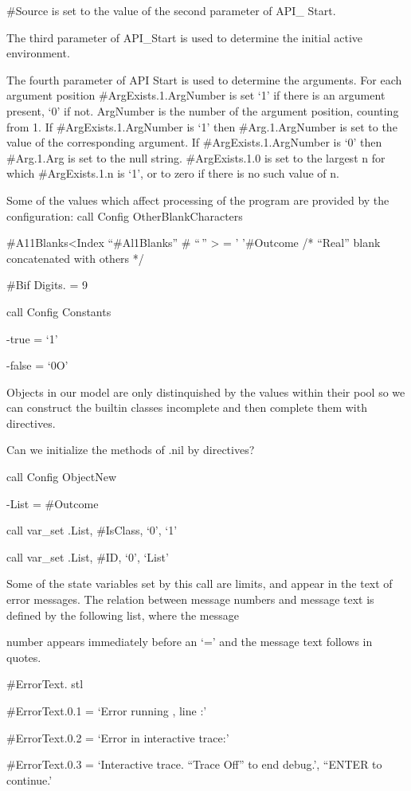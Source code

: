 \#Source is set to the value of the second parameter of API\_ Start.

The third parameter of API\_Start is used to determine the initial
active environment.

The fourth parameter of API Start is used to determine the arguments.
For each argument position \#ArgExists.1.ArgNumber is set `1' if there
is an argument present, `0' if not. ArgNumber is the number of the
argument position, counting from 1. If \#ArgExists.1.ArgNumber is `1'
then \#Arg.1.ArgNumber is set to the value of the corresponding
argument. If \#ArgExists.1.ArgNumber is `0' then \#Arg.1.Arg is set to
the null string. \#ArgExists.1.0 is set to the largest n for which
\#ArgExists.1.n is `1', or to zero if there is no such value of n.

Some of the values which affect processing of the program are provided
by the configuration: call Config OtherBlankCharacters

\#A11Blanks\textless Index ``\#Al1Blanks'' \# ``\,'' \textgreater{} = '
'\#Outcome /* ``Real'' blank concatenated with others */

\#Bif Digits. = 9

call Config Constants

-true = `1'

-false = `0O'

Objects in our model are only distinquished by the values within their
pool so we can construct the builtin classes incomplete and then
complete them with directives.

Can we initialize the methods of .nil by directives?

call Config ObjectNew

-List = \#Outcome

call var\_set .List, \#IsClass, `0', `1'

call var\_set .List, \#ID, `0', `List'

Some of the state variables set by this call are limits, and appear in
the text of error messages. The relation between message numbers and
message text is defined by the following list, where the message

number appears immediately before an `=' and the message text follows in
quotes.

\#ErrorText. stl

\#ErrorText.0.1 = `Error running , line :'

\#ErrorText.0.2 = `Error in interactive trace:'

\#ErrorText.0.3 = `Interactive trace. ``Trace Off'' to end debug.',
``ENTER to continue.'

